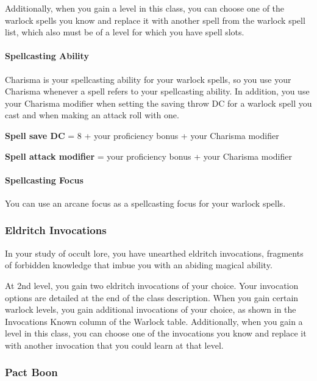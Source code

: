 \documentclass[
]{article}
\begin{document}
Additionally, when you gain a level in this class, you can choose one of
the warlock spells you know and replace it with another spell from the
warlock spell list, which also must be of a level for which you have
spell slots.

\hypertarget{spellcasting-ability}{%
\paragraph{Spellcasting Ability}\label{spellcasting-ability}}

Charisma is your spellcasting ability for your warlock spells, so you
use your Charisma whenever a spell refers to your spellcasting ability.
In addition, you use your Charisma modifier when setting the saving
throw DC for a warlock spell you cast and when making an attack roll
with one.

\textbf{Spell save DC} = 8 + your proficiency bonus + your Charisma
modifier

\textbf{Spell attack modifier} = your proficiency bonus + your Charisma
modifier

\hypertarget{spellcasting-focus}{%
\paragraph{Spellcasting Focus}\label{spellcasting-focus}}

You can use an arcane focus as a spellcasting focus for your warlock
spells.

\hypertarget{eldritch-invocations}{%
\subsubsection{Eldritch Invocations}\label{eldritch-invocations}}

In your study of occult lore, you have unearthed eldritch invocations,
fragments of forbidden knowledge that imbue you with an abiding magical
ability.

At 2nd level, you gain two eldritch invocations of your choice. Your
invocation options are detailed at the end of the class description.
When you gain certain warlock levels, you gain additional invocations of
your choice, as shown in the Invocations Known column of the Warlock
table. Additionally, when you gain a level in this class, you can choose
one of the invocations you know and replace it with another invocation
that you could learn at that level.

\hypertarget{pact-boon}{%
\subsubsection{Pact Boon}\label{pact-boon}}
\end{document}
